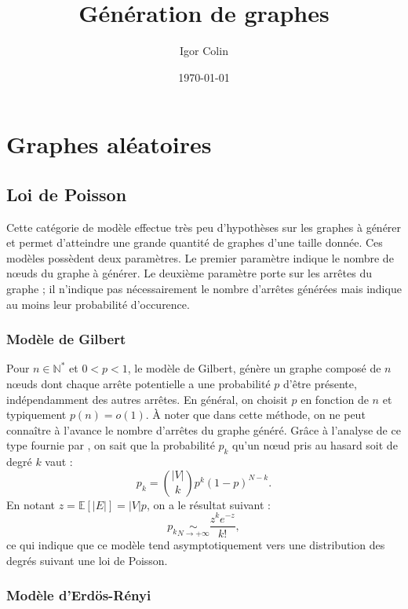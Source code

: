\documentclass[a4paper]{article}
\title{Génération de graphes}
\author{Igor Colin}
\date{\today}
\begin{document}
\section{Graphes aléatoires}
\label{sec:graphes_aleatoires}

    \subsection{Loi de Poisson}
    \label{sub:loi_de_poisson}
        Cette catégorie de modèle effectue très peu d'hypothèses sur les
        graphes à générer et permet d'atteindre une grande quantité de graphes
        d'une taille donnée. Ces modèles possèdent deux paramètres. Le premier
        paramètre indique le nombre de n\oe{}uds du graphe à générer. Le
        deuxième paramètre porte sur les arrêtes du graphe ; il n'indique pas
        nécessairement le nombre d'arrêtes générées mais indique au moins leur
        probabilité d'occurence.

        \subsubsection{Modèle de Gilbert}
            Pour $n \in \mathbb{N}^*$ et $0 < p < 1$, le modèle de Gilbert,
            génère un graphe composé de $n$ n\oe{}uds dont chaque arrête
            potentielle a une probabilité $p$ d'être présente, indépendamment
            des autres arrêtes.
            En général, on choisit $p$ en fonction de $n$ et typiquement
            $p(n) = o(1)$. \`A noter que dans cette méthode, on ne peut
            connaître à l'avance le nombre d'arrêtes du graphe généré.
            Gr\^ace à l'analyse de ce type fournie par \cite{newman2001random},
            on sait que la probabilité $p_k$ qu'un n\oe{}ud pris au hasard
            soit de degré $k$ vaut :
            \[
                p_k = \binom{|V|}{k} p^k (1 - p)^{N - k}.
            \]
            En notant $z = \mathbb{E}\left[|E|\right] = |V|p$, on a le résultat
            suivant :
            \[
                p_k \underset{N \rightarrow +\infty}{\sim}
                \frac{z^k e^{-z}}{k!},
            \]
            ce qui indique que ce modèle tend asymptotiquement vers une
            distribution des degrés suivant une loi de Poisson.

        \subsubsection{Modèle d'Erdös-Rényi}
\end{document}
